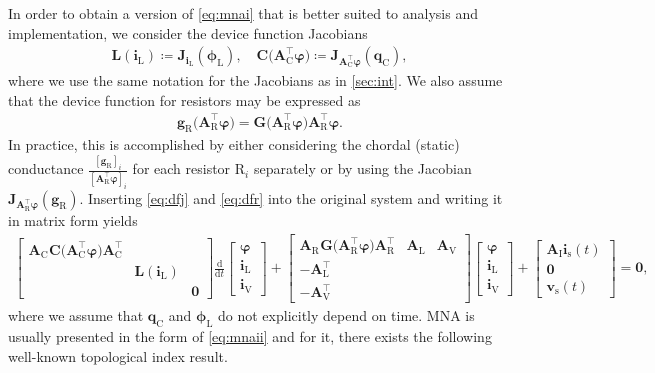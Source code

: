 \documentclass[AMA,STIX1COL]{WileyNJD-v2}
\newcommand{\mb}[1]{\mathbf{#1}}
\newcommand{\mr}[1]{\mathrm{#1}}
\newcommand{\T}{{\!\top}}
\newcommand{\ddt}{\frac{\mathrm{d}}{\mathrm{d}t}}
\newcommand{\A}[1]{\mb{A}_\mr{#1}}
\newcommand{\AT}[1]{\mb{A}_\mr{#1}^{\T}}
\newcommand{\qC}{\mb{q}_\mr{C}}
\newcommand{\gR}{\mb{g}_\mr{R}}
\newcommand{\phiL}{\boldsymbol{\phi}_\mr{L}}
\newcommand{\vphi}{\boldsymbol{\varphi}}
\renewcommand{\i}[1]{\mb{i}_\mr{#1}}
\renewcommand{\v}[1]{\mb{v}_\mr{#1}}
\begin{document}
In order to obtain a version of \eqref{eq:mnai} that is better suited to analysis and implementation, we consider the device function Jacobians
\begin{align}
    \mb{L}(\i{L}) \coloneqq \mb{J}_{\i{L}}(\phiL), \quad \mb{C} \big( \AT{C} \vphi \big) \coloneqq \mb{J}_{\AT{C} \vphi}(\qC) \label{eq:dfj},
\end{align}
where we use the same notation for the Jacobians as in \autoref{sec:int}. We also assume that the device function for resistors may be expressed as
\begin{align}
    \gR \big( \AT{R} \vphi \big) = \mb{G} \big( \AT{R} \vphi \big) \AT{R} \vphi \label{eq:dfr}.
\end{align}
In practice, this is accomplished by either considering the chordal (static) conductance $\frac{[\gR]_i}{[\AT{R} \vphi]_i}$ for each resistor $\mr{R}_i$ separately or by using the Jacobian $\mathbf{J}_{ \AT{R} \vphi}(\gR)$. Inserting \eqref{eq:dfj} and \eqref{eq:dfr} into the original system and writing it in matrix form yields
\begin{align}
    \begin{bmatrix}
        \A{C}^{\phantom{\T}} \mb{C} \big( \AT{C} \vphi \big) \AT{C} & &\\
        & \mb{L}(\i{L}) &\\
        & & \mb{0}
    \end{bmatrix} \ddt \begin{bmatrix}
        \vphi\\
        \i{L}\\
        \i{V}
    \end{bmatrix} + \begin{bmatrix}
        \A{R}^{\phantom{\T}} \mb{G} \big( \AT{R} \vphi \big) \AT{R} & \A{L} & \A{V}\\
        -\AT{L} & &\\
        -\AT{V} & &
    \end{bmatrix} \begin{bmatrix}
        \vphi\\
        \i{L}\\
        \i{V}
    \end{bmatrix} + \begin{bmatrix}
        \A{I} \i{s}(t)\\
        \mb{0}\\
        \v{s}(t)
    \end{bmatrix} = \mb{0} \label{eq:mnaii},
\end{align}
where we assume that $\qC$ and $\phiL$ do not explicitly depend on time. MNA is usually presented in the form of \eqref{eq:mnaii} and for it, there exists the following well-known topological index result.
\end{document}
